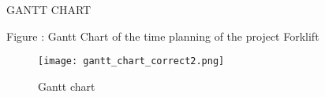 \documentclass[../report.tex]{subfiles}
\begin{document}
    GANTT CHART


 Figure : Gantt Chart of the time planning of the project Forklift

 \begin{figure}[h!]
    \centering
    \texttt{[image: gantt\_chart\_correct2.png]}
    \caption{Gantt chart}
 \end{figure}
  
\end{document}
